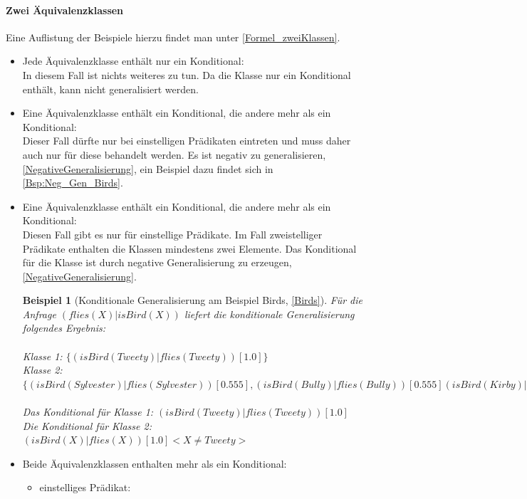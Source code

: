 \documentclass[a4paper, 11pt]{book}
\newtheorem{Bsp}{Beispiel}[section]
\begin{document}
{\paragraph{Zwei Äquivalenzklassen}
Eine Auflistung der Beispiele hierzu findet man unter \ref{Formel_zweiKlassen}.
\begin{itemize}
	\item Jede Äquivalenzklasse enthält nur ein Konditional:\\
	In diesem Fall ist nichts weiteres zu tun. Da die Klasse nur ein Konditional enthält, kann nicht generalisiert werden. 
	\item Eine Äquivalenzklasse enthält ein Konditional, die andere mehr als ein Konditional:\\
	Dieser Fall dürfte nur bei einstelligen Prädikaten eintreten und muss daher auch nur für diese behandelt werden. Es ist negativ zu generalisieren, \ref{NegativeGeneralisierung}, ein Beispiel dazu findet sich in \ref{Bsp:Neg_Gen_Birds}.
	\item Eine Äquivalenzklasse enthält ein Konditional, die andere mehr als ein Konditional:\\
	Diesen Fall gibt es nur für einstellige Prädikate. Im Fall zweistelliger Prädikate enthalten die Klassen mindestens zwei Elemente. Das Konditional für die Klasse ist durch negative Generalisierung zu erzeugen, \ref{NegativeGeneralisierung}. 
	\begin{Bsp}[Konditionale Generalisierung am Beispiel Birds, \ref{Birds}]
	Für die Anfrage $ (flies(X) | isBird(X)) $ liefert die konditionale Generalisierung folgendes Ergebnis:\\
	\\
	Klasse 1: $ \{(isBird(Tweety)|flies(Tweety))[1.0]\} $\\
	Klasse 2: $ \{(isBird(Sylvester)|flies(Sylvester))[0.555], (isBird(Bully)|flies(Bully))[0.555] (isBird(Kirby)|flies(Kirby))[0.555] \}  $\\
	\\
	Das Konditional für Klasse 1: $ (isBird(Tweety)|flies(Tweety))[1.0]$\\
	Die Konditional für Klasse 2: $ (isBird(X)|flies(X))[1.0] <X \neq Tweety>$\\
	\end{Bsp}
	\item Beide Äquivalenzklassen enthalten mehr als ein Konditional:\\
	\begin{itemize}
		\item einstelliges Prädikat:\\

\end{itemize}
\end{itemize}}
\end{document}

